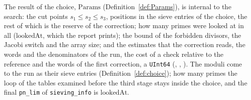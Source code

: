 The result of the choice, $\mathrm{Params}$ (Definition~\ref{def:Params}), is internal to the
search: the cut points $s_1 \le s_2 \le s_3$, positions in the sieve entries of the choice, the rest
of which is the reserve of the correction; how many primes were looked at in all
($\mathrm{lookedAt}$, which the report prints); the bound of the forbidden divisors, the Jacobi
switch and the array size; and the estimates that the correction reads, the words and the
denominators of the run, the cost of a check relative to the reference and the words of the first
correction, a \verb|UInt64| (, ,
). The moduli come to the run as their sieve entries
(Definition~\ref{def:choice}); how many primes the loop of the tables examined before the third
stage stays inside the choice, and the final \verb|pn_lim| of \verb|sieving_info| is
$\mathrm{lookedAt}$.

